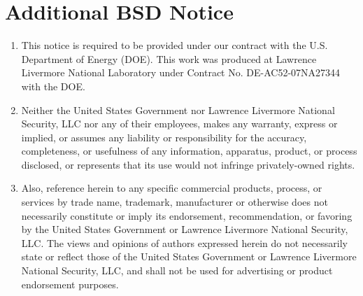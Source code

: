 \documentclass[a4paper, 12pt]{article}
\begin{document}
\section*{Additional BSD Notice}

\begin{enumerate}
\item This notice is required to be provided under our contract with the U.S. Department of Energy (DOE). This work was produced at Lawrence Livermore National Laboratory under Contract No. DE-AC52-07NA27344 with the DOE.
\item Neither the United States Government nor Lawrence Livermore National Security, LLC nor any of their employees, makes any warranty, express or implied, or assumes any liability or responsibility for the accuracy, completeness, or usefulness of any information, apparatus, product, or process disclosed, or represents that its use would not infringe privately-owned rights.
\item Also, reference herein to any specific commercial products, process,
or services by trade name, trademark, manufacturer or otherwise does not necessarily constitute or imply its endorsement, recommendation, or favoring by the United States Government or Lawrence Livermore National Security, LLC. The views and opinions of authors expressed herein do not necessarily state or reflect those of the United States Government or Lawrence Livermore National Security, LLC, and shall not be used for advertising or product endorsement purposes.
\end{enumerate}
\end{document}
